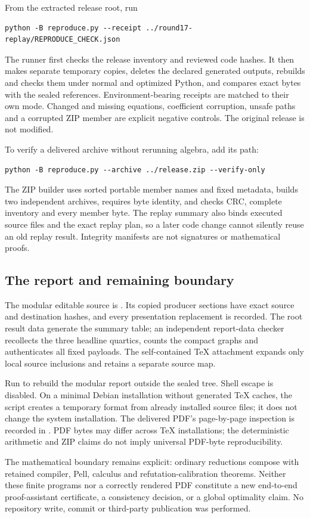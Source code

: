 From the extracted release root, run
\begin{verbatim}
python -B reproduce.py --receipt ../round17-replay/REPRODUCE_CHECK.json
\end{verbatim}
The runner first checks the release inventory and reviewed code hashes.
It then makes separate temporary copies, deletes the declared generated
outputs, rebuilds and checks them under normal and optimized Python, and
compares exact bytes with the sealed references. Environment-bearing
receipts are matched to their own mode. Changed and missing equations,
coefficient corruption, unsafe paths and a corrupted ZIP member are explicit
negative controls. The original release is not modified.

To verify a delivered archive without rerunning algebra, add its path:
\begin{verbatim}
python -B reproduce.py --archive ../release.zip --verify-only
\end{verbatim}
The ZIP builder uses sorted portable member names and fixed metadata,
builds two independent archives, requires byte identity, and checks CRC,
complete inventory and every member byte. The replay summary also binds
executed source files and the exact replay plan, so a later code change
cannot silently reuse an old replay result. Integrity manifests are not
signatures or mathematical proofs.

\subsection{The report and remaining boundary}
The modular editable source is . Its copied
producer sections have exact source and destination hashes, and every
presentation replacement is recorded. The root result data generate the
summary table; an independent report-data checker recollects the three
headline quartics, counts the compact graphs and authenticates all fixed
payloads. The self-contained TeX attachment expands only local source
inclusions and retains a separate source map.

Run  to rebuild the modular report outside the
sealed tree. Shell escape is disabled. On a minimal Debian installation
without generated TeX caches, the script creates a temporary format from
already installed source files; it does not change the system installation.
The delivered PDF's page-by-page inspection is recorded in
. PDF bytes may differ across TeX installations;
the deterministic arithmetic and ZIP claims do not imply universal PDF-byte
reproducibility.

The mathematical boundary remains explicit: ordinary reductions compose with
retained compiler, Pell, calculus and refutation-calibration theorems.
Neither these finite programs nor a correctly rendered PDF constitute a new
end-to-end proof-assistant certificate, a consistency decision, or a global
optimality claim. No repository write, commit or third-party publication was
performed.
